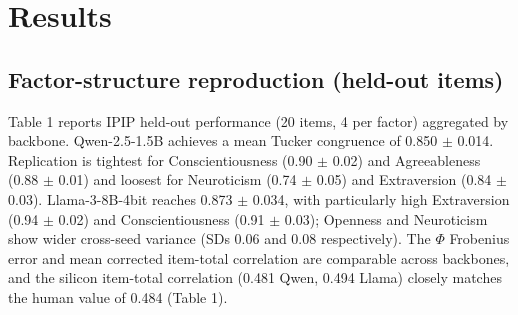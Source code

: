 \documentclass[11pt]{article}
\begin{document}
\section{Results}

\subsection{Factor-structure reproduction (held-out items)}

Table 1 reports IPIP held-out performance (20 items, 4 per factor) aggregated by backbone. Qwen-2.5-1.5B achieves a mean Tucker congruence of 0.850 $\pm$ 0.014. Replication is tightest for Conscientiousness (0.90 $\pm$ 0.02) and Agreeableness (0.88 $\pm$ 0.01) and loosest for Neuroticism (0.74 $\pm$ 0.05) and Extraversion (0.84 $\pm$ 0.03). Llama-3-8B-4bit reaches 0.873 $\pm$ 0.034, with particularly high Extraversion (0.94 $\pm$ 0.02) and Conscientiousness (0.91 $\pm$ 0.03); Openness and Neuroticism show wider cross-seed variance (SDs 0.06 and 0.08 respectively). The $\Phi$ Frobenius error and mean corrected item-total correlation are comparable across backbones, and the silicon item-total correlation (0.481 Qwen, 0.494 Llama) closely matches the human value of 0.484 (Table 1).

\begin{table}[ht!]
\centering
\caption{Tucker congruence coefficients and related psychometric indices for the IPIP held-out set (20 items, 4 per factor). Tucker: mean Tucker congruence across the five matched factors. O–N: per-factor Tucker congruence for Openness (O), Conscientiousness (C), Extraversion (E), Agreeableness (A), and Neuroticism (N). $\Phi$ error: Frobenius norm of the difference between the silicon and human inter-factor correlation matrices. item-r: mean corrected item-total correlation over the held-out items (human reference 0.484). All values are mean $\pm$ SD across five seeds. SD reflects cross-seed variability in how consistently each factor is recovered.}
\end{table}
\end{document}
